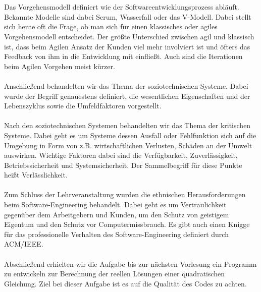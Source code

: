 \\\\
Das Vorgehensmodell definiert wie der Softwareentwicklungsprozess abläuft. Bekannte Modelle sind dabei Scrum, Wasserfall oder das V-Modell. Dabei stellt sich heute oft die Frage, ob man sich für einen klassisches oder agiles Vorgehensmodell entscheidet. Der größte Unterschied zwischen agil und klassisch ist, dass beim Agilen Ansatz der Kunden viel mehr involviert ist und öfters das Feedback von ihm in die Entwicklung mit einfließt. Auch sind die Iterationen beim Agilen Vorgehen meist kürzer.
\\\\
Anschließend behandelten wir das Thema der soziotechnischen Systeme. Dabei wurde der Begriff genauestens definiert, die wesentlichen Eigenschaften und der Lebenszyklus sowie die Umfeldfaktoren vorgestellt.
\\\\
Nach den soziotechnischen Systemen behandelten wir das Thema der kritischen Systeme. Dabei geht es um Systeme dessen Ausfall oder Fehlfunktion sich auf die Umgebung in Form von z.B. wirtschaftlichen Verlusten, Schäden an der Umwelt  auswirken. Wichtige Faktoren dabei sind die Verfügbarkeit, Zuverlässigkeit, Betriebssicherheit und Systemsicherheit. Der Sammelbegriff für diese Punkte heißt Verlässlichkeit.
\\\\
Zum Schluss der Lehrveranstaltung wurden die ethnischen Herausforderungen beim Software-Engineering behandelt. Dabei geht es um Vertraulichkeit gegenüber dem Arbeitgebern und Kunden, um den Schutz von geistigem Eigentum und den Schutz vor Computermissbrauch. Es gibt auch einen Knigge für das professionelle Verhalten des Software-Engineering definiert durch ACM/IEEE.
\\\\
Abschließend erhielten wir die Aufgabe bis zur nächsten Vorlesung ein Programm zu entwickeln zur Berechnung der reellen Lösungen einer quadratischen Gleichung. Ziel bei dieser Aufgabe ist es auf die Qualität des Codes zu achten. 
